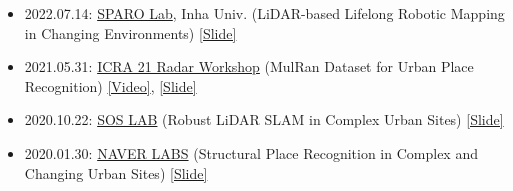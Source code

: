 \begin{itemize}[label=$\cdot$]
    \item 2022.07.14: \href{https://sites.google.com/view/sparo/홈}{SPARO Lab}, Inha Univ. (LiDAR-based Lifelong Robotic Mapping in Changing Environments) \href{https://docs.google.com/presentation/d/1Muld60rT7KY_FaN4hyRaPHR2FsPkLV8z7fz7rYQzIv4/edit?usp=sharing}{[Slide]}
    
    \item 2021.05.31: \href{https://sites.google.com/view/radar-robotics/home}{ICRA 21 Radar Workshop} (MulRan Dataset for Urban Place Recognition) \href{https://www.youtube.com/watch?v=jFvKW9Kj8Ts}{[Video]}, \href{https://www.dropbox.com/s/dknylah6b7rizr8/20210531\%20icra\%20ws\%20mulran\%20v3.pptx?dl=0}{[Slide]}
    
    \item 2020.10.22: \href{http://soslab.co/}{SOS LAB} (Robust LiDAR SLAM in Complex Urban Sites) \href{https://www.dropbox.com/s/p30dpjqjbjhq69x/20201022\%20SOSLAB\%20talk\%20Giseop\%20Kim\%20share.pdf?dl=0}{[Slide]}
    
    \item 2020.01.30: \href{https://www.naverlabs.com/}{NAVER LABS} (Structural Place Recognition in Complex and Changing Urban Sites) \href{https://www.google.com/url?q=https\%3A\%2F\%2Fwww.dropbox.com\%2Fs\%2Fcoul2elzlulbj1j\%2FStructural\%2520Place\%2520Recognition\%2520in\%2520Complex\%2520and\%2520Changing\%2520Urban\%2520Sites.pptx\%3Fdl\%3D0&sa=D&sntz=1&usg=AFQjCNF6McgylrY6kU5KmqvCLC6_n-TzIw}{[Slide]}
\end{itemize}

